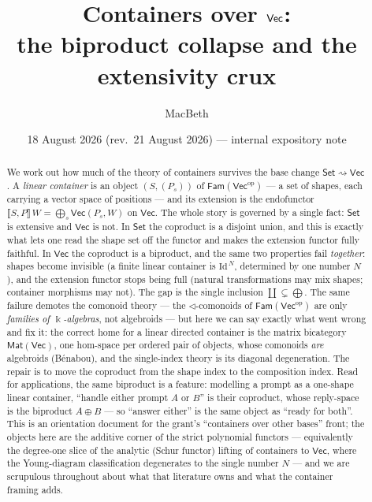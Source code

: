 \documentclass[11pt]{amsart}
\title[Containers over $\Vec$]{Containers over $\Vec$:\\ the biproduct collapse and the extensivity crux}
\author{MacBeth}
\date{18 August 2026 (rev.\ 21 August 2026) --- internal expository note}
\theoremstyle{plain}
\theoremstyle{definition}
\renewcommand{\Vec}{\mathsf{Vec}}
\newcommand{\Set}{\mathsf{Set}}
\newcommand{\Fam}{\mathsf{Fam}}
\newcommand{\Mat}{\mathsf{Mat}}
\newcommand{\op}{\mathrm{op}}
\newcommand{\Id}{\mathrm{Id}}
\newcommand{\ext}[1]{\llbracket #1 \rrbracket}
\newcommand{\fld}{\Bbbk}
\DeclareMathOperator{\dcoprod}{\textstyle\coprod}
\begin{document}
\begin{abstract}
We work out how much of the theory of containers survives the base change
$\Set \rightsquigarrow \Vec$. A \emph{linear container} is an object
$(S,(P_s))$ of $\Fam(\Vec^\op)$ --- a set of shapes, each carrying a
vector space of positions --- and its extension is the endofunctor
$\ext{S,P}\,W = \bigoplus_{s} \Vec(P_s, W)$ on $\Vec$. The whole story is
governed by a single fact: $\Set$ is extensive and $\Vec$ is not. In $\Set$
the coproduct is a disjoint union, and this is exactly what lets one read the
shape set off the functor and makes the extension functor fully faithful. In
$\Vec$ the coproduct is a biproduct, and the same two properties fail
\emph{together}: shapes become invisible (a finite linear container is
$\Id^{\,N}$, determined by one number $N$), and the extension functor stops
being full (natural transformations may mix shapes; container morphisms may
not). The gap is the single inclusion $\dcoprod \subsetneq \bigoplus$. The same failure
demotes the comonoid theory --- the $\lhd$-comonoids of $\Fam(\Vec^\op)$ are only
\emph{families of $\fld$-algebras}, not algebroids --- but here we can say exactly
what went wrong and fix it: the correct home for a linear directed container is the
matrix bicategory $\Mat(\Vec)$, one hom-space per ordered pair of objects, whose
comonoids \emph{are} algebroids (B\'enabou), and the single-index theory is its
diagonal degeneration. The repair is to move the coproduct from the shape index to
the composition index. Read for applications, the same biproduct is a feature:
modelling a prompt as a one-shape linear container, ``handle either prompt $A$ or $B$''
is their coproduct, whose reply-space is the biproduct $A\oplus B$ --- so ``answer
either'' is the same object as ``ready for both''. This is
an orientation document for the grant's ``containers over other bases''
front; the objects here are the additive corner of the strict polynomial
functors --- equivalently the degree-one slice of the analytic (Schur functor)
lifting of containers to $\Vec$, where the Young-diagram classification
degenerates to the single number $N$ --- and we are scrupulous throughout about
what that literature owns and what the container framing adds.
\end{abstract}

\maketitle

\tableofcontents
\end{document}
